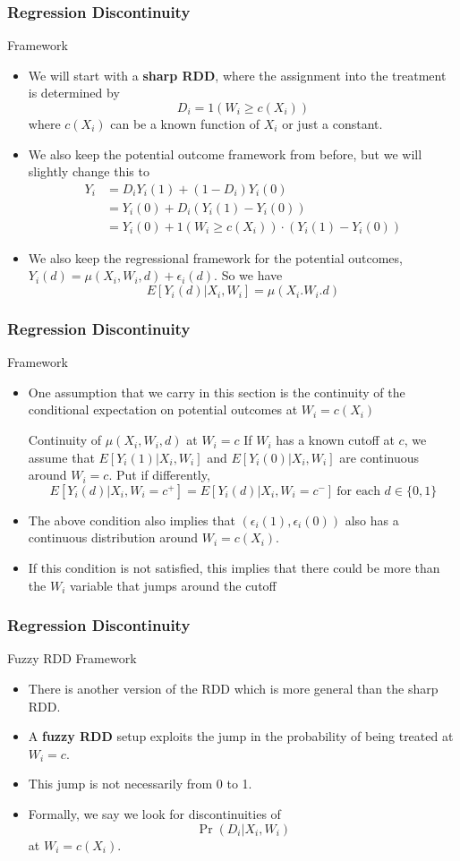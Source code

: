 \documentclass{beamer}
\begin{document}
\begin{frame}
\frametitle{Regression Discontinuity}
Framework
\begin{itemize}
\item We will start with a \textbf{sharp RDD}, where the assignment into the treatment is determined by
\[
D_i=1(W_i\geq c(X_i))
\]
where $c(X_i)$ can be a known function of $X_i$ or just a constant. 
\item We also keep the potential outcome framework from before, but we will slightly change this to
\small{\begin{align*}
Y_i& = D_iY_i(1)+(1-D_i)Y_i(0)\\
&=Y_i(0)+D_i(Y_i(1)-Y_i(0))\\
&=Y_i(0)+1(W_i\geq c(X_i))\cdot(Y_i(1)-Y_i(0))
\end{align*}}\normalsize
\item We also keep the regressional framework for the potential outcomes, $Y_i(d)=\mu(X_i,W_i,d)+\epsilon_i(d)$. So we have
\small{\[
E[Y_i(d)|X_i,W_i]=\mu(X_i.W_i.d)
\]}\normalsize
\end{itemize}
\end{frame}

\begin{frame}
\frametitle{Regression Discontinuity}
Framework
\begin{itemize}
\item One assumption that we carry in this section is the continuity of the conditional expectation on potential outcomes at $W_i=c(X_i)$
\begin{block}{Continuity of $\mu(X_i,W_i,d)$ at $W_i=c$}
If $W_i$ has a known cutoff at $c$, we assume that $E[Y_i(1)|X_i, W_i]$ and $E[Y_i(0)|X_i, W_i]$ are continuous around $W_i=c$. Put if differently, 
\[
E[Y_i(d)|X_i, W_i=c^+]=E[Y_i(d)|X_i, W_i=c^-] \ \text{for each } d\in\{0,1\}
\]
\end{block}
\item The above condition also implies that $(\epsilon_i(1), \epsilon_i(0))$ also has a continuous distribution around $W_i=c(X_i)$.
\item If this condition is not satisfied, this implies that there could be more than the $W_i$ variable that jumps around the cutoff
\end{itemize}
\end{frame}

\begin{frame}
\frametitle{Regression Discontinuity}
Fuzzy RDD Framework
\begin{itemize}
\item There is another version of the RDD which is more general than the sharp RDD.
\item A \textbf{fuzzy RDD} setup exploits the jump in the probability of being treated at $W_i=c$. 
\item This jump is not necessarily from 0 to 1. 
\item Formally, we say we look for discontinuities of 
\[
\Pr(D_i|X_i,W_i)
\]
at $W_i=c(X_i)$. 
\end{itemize}
\end{frame}
\end{document}
